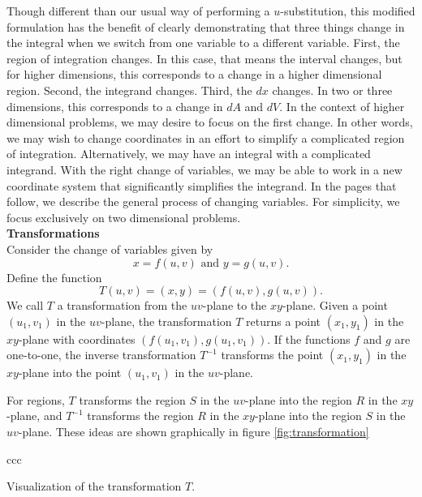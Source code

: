 Though different than our usual way of performing a $u$-substitution, this modified formulation has the benefit of clearly demonstrating that three things change in the integral when we switch from one variable to a different variable.  First, the region of integration changes.  In this case, that means the interval changes, but for higher dimensions, this corresponds to a change in a higher dimensional region.  Second, the integrand changes.  Third, the $dx$ changes.  In two or three dimensions, this corresponds to a change in $dA$ and $dV.$ In the context of higher dimensional problems, we may desire to focus on the first change.  In other words, we may wish to change coordinates in an effort to simplify a complicated region of integration.  Alternatively, we may have an integral with a complicated integrand.  With the right change of variables, we may be able to work in a new coordinate system that significantly simplifies the integrand.  In the pages that follow, we describe the general process of changing variables.  For simplicity, we focus exclusively on two dimensional problems.\\

\noindent\textbf{\large Transformations}\\

Consider the change of variables given by
\[
	x = f(u,v) \text{ and } y = g(u,v).
\]
Define the function
\[
	T(u,v) = (x,y) = (f(u,v),g(u,v)).
\]
We call $T$ a transformation from the $uv$-plane to the $xy$-plane.  Given a point $(u_1,v_1)$ in the $uv$-plane, the transformation $T$ returns a point $(x_1,y_1)$ in the $xy$-plane with coordinates $(f(u_1,v_1),g(u_1,v_1)).$  If the functions $f$ and $g$ are one-to-one, the inverse transformation $T^{-1}$ transforms the point $(x_1,y_1)$ in the $xy$-plane into the point $(u_1,v_1)$ in the $uv$-plane.

For regions, $T$ transforms the region $S$ in the $uv$-plane into the region $R$ in the $xy$-plane, and $T^{-1}$ transforms the region $R$ in the $xy$-plane into the region $S$ in the $uv$-plane.  These ideas are shown graphically in figure \ref{fig:transformation}


\addtocounter{figure}{1}
\vskip 10pt
\noindent\begin{minipage}{\textwidth+100pt}
	\begin{center}{ccc}
	\end{center}
	\captionsetup{type=figure}%
	\caption{Visualization of the transformation $T$.}
	\label{fig:transformation}
\end{minipage}
\\
\vskip10pt
\addtocounter{figure}{-2}



